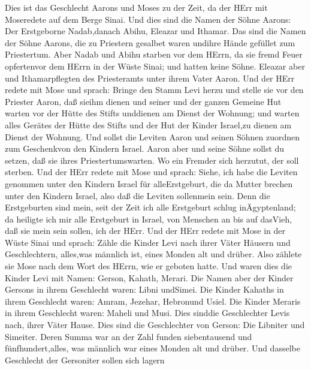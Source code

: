  Dies ist das Geschlecht Aarons und Moses zu der Zeit, da
der HErr mit Moseredete auf dem Berge Sinai.  Und dies sind
die Namen der Söhne Aarons: Der Erstgeborne Nadab,danach Abihu, Eleazar
und Ithamar.  Das sind die Namen der Söhne Aarons, die zu
Priestern gesalbet waren undihre Hände gefüllet zum Priestertum.
 Aber Nadab und Abihu starben vor dem HErrn, da sie fremd
Feuer opfertenvor dem HErrn in der Wüste Sinai; und hatten keine Söhne.
Eleazar aber und Ithamarpflegten des Priesteramts unter ihrem Vater
Aaron.  Und der HErr redete mit Mose und sprach:
 Bringe den Stamm Levi herzu und stelle sie vor den Priester
Aaron, daß sieihm dienen  und seiner und der ganzen Gemeine
Hut warten vor der Hütte des Stifts unddienen am Dienst der Wohnung;
 und warten alles Gerätes der Hütte des Stifts und der Hut
der Kinder Israel,zu dienen am Dienst der Wohnung.  Und
sollst die Leviten Aaron und seinen Söhnen zuordnen zum Geschenkvon den
Kindern Israel.  Aaron aber und seine Söhne sollst du
setzen, daß sie ihres Priestertumswarten. Wo ein Fremder sich herzutut,
der soll sterben.  Und der HErr redete mit Mose und sprach:
 Siehe, ich habe die Leviten genommen unter den Kindern
Israel für alleErstgeburt, die da Mutter brechen unter den Kindern
Israel, also daß die Leviten sollenmein sein.  Denn die
Erstgeburten sind mein, seit der Zeit ich alle Erstgeburt schlug
inÄgyptenland; da heiligte ich mir alle Erstgeburt in Israel, von
Menschen an bis auf dasVieh, daß sie mein sein sollen, ich der HErr.
 Und der HErr redete mit Mose in der Wüste Sinai und
sprach:  Zähle die Kinder Levi nach ihrer Väter Häusern und
Geschlechtern, alles,was männlich ist, eines Monden alt und drüber.
 Also zählete sie Mose nach dem Wort des HErrn, wie er
geboten hatte.  Und waren dies die Kinder Levi mit Namen:
Gerson, Kahath, Merari.  Die Namen aber der Kinder Gersons
in ihrem Geschlecht waren: Libni undSimei.  Die Kinder
Kahaths in ihrem Geschlecht waren: Amram, Jezehar, Hebronund Usiel.
 Die Kinder Meraris in ihrem Geschlecht waren: Maheli und
Musi. Dies sinddie Geschlechter Levis nach, ihrer Väter Hause.
 Dies sind die Geschlechter von Gerson: Die Libniter und
Simeiter.  Deren Summa war an der Zahl funden siebentausend
und fünfhundert,alles, was männlich war eines Monden alt und drüber.
 Und dasselbe Geschlecht der Gersoniter sollen sich lagern

